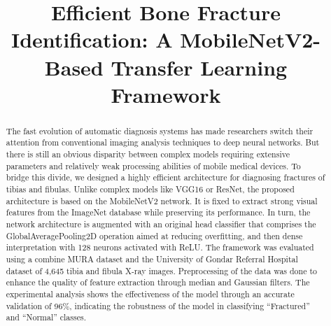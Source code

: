 \documentclass[conference]{IEEEtran}
\begin{document}
\title{Efficient Bone Fracture Identification: A MobileNetV2-Based Transfer Learning Framework\\
}

\author{
\and
{}

\and
{}


}

\maketitle

\begin{abstract}
The fast evolution of automatic diagnosis systems has made researchers switch their attention from conventional imaging analysis techniques to deep neural networks. But there is still an obvious disparity between complex models requiring extensive parameters and relatively weak processing abilities of mobile medical devices. To bridge this divide, we designed a highly efficient architecture for diagnosing fractures of tibias and fibulas. Unlike complex models like VGG16 or ResNet, the proposed architecture is based on the MobileNetV2 network. It is fixed to extract strong visual features from the ImageNet database while preserving its performance. In turn, the network architecture is augmented with an original head classifier that comprises the GlobalAveragePooling2D operation aimed at reducing overfitting, and then dense interpretation with 128 neurons activated with ReLU. The framework was evaluated using a combine MURA dataset and the University of Gondar Referral Hospital dataset of 4,645 tibia and fibula X-ray images. Preprocessing of the data was done to enhance the quality of feature extraction through median and Gaussian filters. The experimental analysis shows the effectiveness of the model through an accurate validation of 96\%, indicating the robustness of the model in classifying “Fractured” and “Normal” classes.


\end{abstract}
\end{document}
